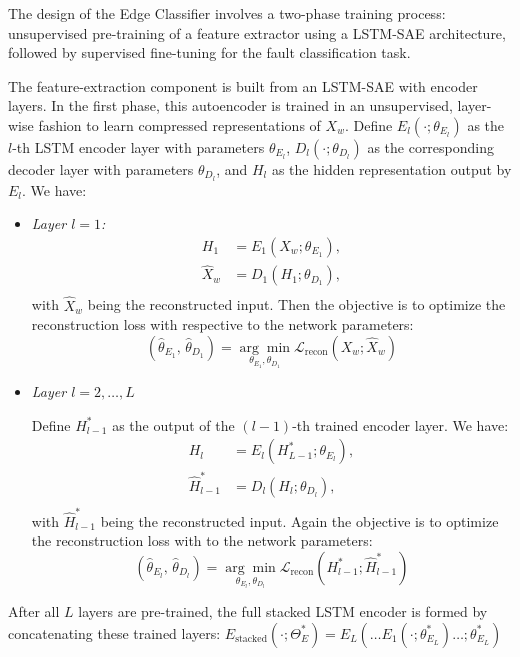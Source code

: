 The design of the Edge Classifier involves a two-phase training process: unsupervised pre-training of a feature extractor using a LSTM-SAE architecture, followed by supervised fine-tuning for the fault classification task.

The feature-extraction component is built from an LSTM-SAE with encoder layers. In the first phase, this autoencoder is trained in an unsupervised, layer-wise fashion to learn compressed representations of \(X_w\). Define \(E_l(\cdot; \theta_{E_l})\) as the \(l\)-th LSTM encoder layer with parameters \(\theta_{E_l}\), \(D_l(\cdot; \theta_{D_l})\) as the corresponding decoder layer with parameters \(\theta_{D_l}\), and \(H_l\) as the hidden representation output by \(E_l\). We have:
\begin{itemize}
  \item \emph{Layer \(l=1\):}
    \begin{equation}
      \begin{aligned}
        H_1 &= E_1(X_w; \theta_{E_1}), \\
        \hat X_w &= D_1(H_1; \theta_{D_1}), \\
      \end{aligned}
    \end{equation}
    with \(\hat X_w\) being the reconstructed input. Then the objective is to optimize the reconstruction loss with respective to the network parameters:
    \begin{equation}
      (\hat \theta_{E_1},\,\hat \theta_{D_1}) = \underset{\theta_{E_1}, \theta_{D_1}} {\arg\min} \mathcal L_{\text{recon}}(X_w; \hat X_w)
    \end{equation}
  \item \emph{Layer \(l = 2, \ldots, L\)}

    Define \(H^*_{l-1}\) as the output of the \((l-1)\)-th trained encoder layer. We have:
    \begin{equation}
      \begin{aligned}
        H_l &= E_l(H^*_{L-1}; \theta_{E_l}), \\
        \hat H^*_{l-1} &= D_l(H_l; \theta_{D_l}), \\
      \end{aligned}
    \end{equation}
    with \(\hat H^*_{l-1}\) being the reconstructed input. Again the objective is to optimize the reconstruction loss with to the network parameters:
    \begin{equation}
      (\hat \theta_{E_l},\,\hat \theta_{D_l}) = \underset{\theta_{E_l}, \theta_{D_l}} {\arg\min} \mathcal L_{\text{recon}}(H^*_{l-1}; \hat H^*_{l-1})
    \end{equation}
\end{itemize}
After all \(L\) layers are pre-trained, the full stacked LSTM encoder is formed by concatenating these trained layers: \(E_\text{stacked}(\cdot; \Theta^*_{E}) = E_L(\ldots E_1(\cdot; \theta^*_{E_L}) \ldots;\theta^*_{E_L})\)


